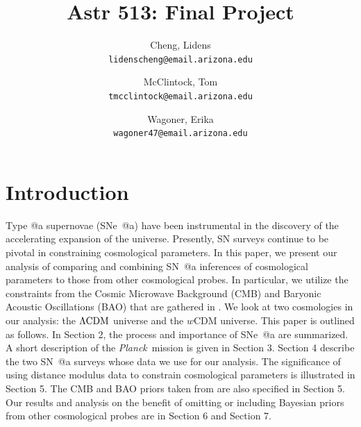 \documentclass[12pt,a4paper]{article}
\author{
  Cheng, Lidens\\
  \texttt{lidenscheng@email.arizona.edu}
  \and
  McClintock, Tom\\
  \texttt{tmcclintock@email.arizona.edu}
  \and
  Wagoner, Erika\\
  \texttt{wagoner47@email.arizona.edu}
}
\title{Astr 513: Final Project}
\makeatletter
\newcommand\Planck{{\it Planck}\ }
\newcommand*{\rom}[1]{\expandafter\@slowromancap\romannumeral #1@}
\newcommand{\sn}{\mbox{SN}}
\newcommand{\sna}{\mbox{SN \rom{1}a}}
\newcommand{\snea}{\mbox{SNe \rom{1}a}}
\makeatother
\begin{document}
\maketitle

\section{Introduction}
\label{sec:Intro}
Type \rom{1}a supernovae (\snea{}) have been instrumental in the discovery 
of the accelerating expansion of the universe. Presently, {\sn} surveys continue 
to be pivotal in constraining cosmological parameters. In this paper, we present 
our analysis of comparing and combining {\sna} inferences of cosmological parameters 
to those from other cosmological probes. In particular, we utilize the constraints 
from the Cosmic Microwave Background (CMB) and Baryonic Acoustic Oscillations 
(BAO) that are gathered in \citet{planck2013}. We look at two cosmologies in our 
analysis: the $\Lambda \textnormal{CDM}$ universe and the $w$CDM universe. This 
paper is outlined as follows. In Section 2, the process and importance of {\snea} 
are summarized. A short description of the \Planck mission is given in Section 3. 
Section 4 describe the two {\sna} surveys whose data we use for our analysis. The 
significance of using distance modulus data to constrain cosmological parameters 
is illustrated in Section 5. The CMB and BAO priors taken from \citet{planck2013} 
are also specified in Section 5. Our results and analysis on the benefit of omitting 
or including Bayesian priors from other cosmological probes 
are in Section 6 and Section 7.  
\end{document}
